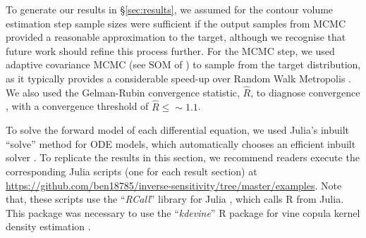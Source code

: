 To generate our results in \S\ref{sec:results}, we assumed for the contour volume estimation step sample sizes were sufficient if the output samples from MCMC provided a reasonable approximation to the target, although we recognise that future work should refine this process further. For the MCMC step, we used adaptive covariance MCMC (see SOM of \cite{johnstone2016uncertainty}) to sample from the target distribution, as it typically provides a considerable speed-up over Random Walk Metropolis \cite{metropolis1953equation,lambert2018Student}. We also used the Gelman-Rubin convergence statistic, $\hat{R}$, to diagnose convergence \cite{lambert2018Student,gelman1992inference}, with a convergence threshold of $\hat{R}\leq\sim 1.1$.

To solve the forward model of each differential equation, we used Julia's inbuilt ``solve'' method for ODE models, which automatically chooses an efficient inbuilt solver \cite{bezanson2017julia}. To replicate the results in this section, we recommend readers execute the corresponding Julia scripts (one for each result section) at \url{https://github.com/ben18785/inverse-sensitivity/tree/master/examples}. Note that, these scripts use the ``\textit{RCall}'' library for Julia \cite{batesRCall}, which calls \textsf{R} from Julia. This package was necessary to use the ``\textit{kdevine}'' \textsf{R} package for vine copula kernel density estimation \cite{naglerkdevine2018}.
